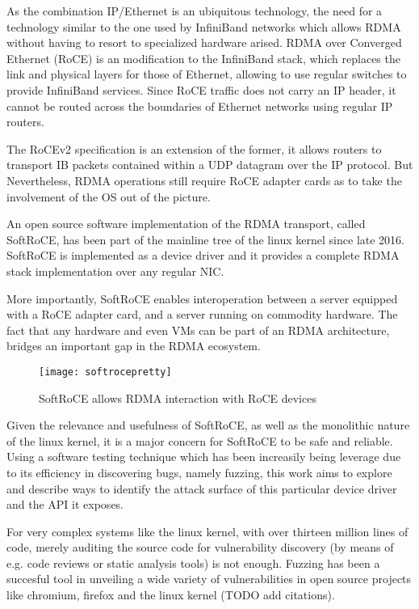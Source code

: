 As the combination IP/Ethernet is an ubiquitous technology, the need for a technology similar
to the one used by InfiniBand networks which allows
RDMA without having to resort to specialized hardware arised. RDMA over Converged Ethernet (RoCE) is an modification
to the InfiniBand stack, which replaces the link and physical layers for those of Ethernet,
allowing to use regular switches to provide InfiniBand services. Since  RoCE traffic does not carry an IP header,
it cannot be routed across the boundaries of Ethernet networks using regular IP routers\cite{rocev2}.

The RoCEv2 specification is an extension of the former, it allows routers to transport
IB packets contained within a UDP datagram over the IP protocol. But Nevertheless, RDMA operations still require RoCE adapter
cards as to take the involvement of the OS out of the picture.

An open source software implementation of the RDMA transport, called SoftRoCE, has been part of the mainline tree of
the linux kernel since late 2016. SoftRoCE is implemented as a device driver and it provides a complete RDMA
stack implementation over any regular NIC\cite{softroce}.

More importantly, SoftRoCE enables interoperation between a server equipped with a RoCE adapter card, and a server running on
commodity hardware. The fact that any hardware and even VMs can be part of an RDMA architecture, bridges an important gap in the RDMA ecosystem.

\begin{figure}[h]
  \centering
  \texttt{[image: softrocepretty]}
  \caption[SoftRoCE]{SoftRoCE allows RDMA interaction with RoCE devices\footnotemark}
  \label{fig:softroce}
\end{figure}


Given the relevance and usefulness of SoftRoCE, as well as the monolithic nature of the linux kernel,
it is a major concern for SoftRoCE to be safe and reliable.
Using a software testing technique which has been increasily being leverage due to its efficiency in
discovering bugs, namely fuzzing, this work aims to explore and describe ways to identify the attack surface
of this particular device driver and the API it exposes.

For very complex systems like the linux kernel, with over thirteen million lines of code, merely auditing the
source code for vulnerability discovery (by means of e.g. code reviews or static analysis tools) is not enough.
Fuzzing has been a succesful tool in unveiling a wide variety of vulnerabilities in open source projects like chromium,
firefox and the linux kernel (TODO add citations).

